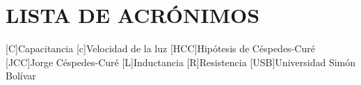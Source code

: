 
\chapter*{LISTA DE ACR\'ONIMOS}
\begin{acronym}
[C]{Capacitancia}
[c]{Velocidad de la luz}
[HCC]{Hipótesis de Céspedes-Curé}
[JCC]{Jorge Céspedes-Curé}
[L]{Inductancia}
[R]{Resistencia}
[USB]{Universidad Sim\'on Bol\'ivar}

\end{acronym}
\clearpage